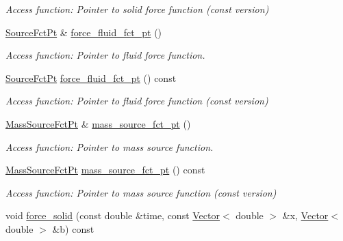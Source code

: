 \begin{DoxyCompactItemize}
\begin{DoxyCompactList}\small\item\em Access function\+: Pointer to solid force function (const version) \end{DoxyCompactList}\item 
\hyperlink{classoomph_1_1PoroelasticityEquations_a234bc29fbd4c3255ef903a3cb5f6361f}{Source\+Fct\+Pt} \& \hyperlink{classoomph_1_1PoroelasticityEquations_a0716cc72117daf3aced6cfd1d3763204}{force\+\_\+fluid\+\_\+fct\+\_\+pt} ()
\begin{DoxyCompactList}\small\item\em Access function\+: Pointer to fluid force function. \end{DoxyCompactList}\item 
\hyperlink{classoomph_1_1PoroelasticityEquations_a234bc29fbd4c3255ef903a3cb5f6361f}{Source\+Fct\+Pt} \hyperlink{classoomph_1_1PoroelasticityEquations_a2523a092b6190b733eb7c97a65587ecf}{force\+\_\+fluid\+\_\+fct\+\_\+pt} () const
\begin{DoxyCompactList}\small\item\em Access function\+: Pointer to fluid force function (const version) \end{DoxyCompactList}\item 
\hyperlink{classoomph_1_1PoroelasticityEquations_a8edb2644708db2f2ae03254ea3143262}{Mass\+Source\+Fct\+Pt} \& \hyperlink{classoomph_1_1PoroelasticityEquations_a043aed834e1643f94afdf078d722a141}{mass\+\_\+source\+\_\+fct\+\_\+pt} ()
\begin{DoxyCompactList}\small\item\em Access function\+: Pointer to mass source function. \end{DoxyCompactList}\item 
\hyperlink{classoomph_1_1PoroelasticityEquations_a8edb2644708db2f2ae03254ea3143262}{Mass\+Source\+Fct\+Pt} \hyperlink{classoomph_1_1PoroelasticityEquations_abdc8804cf42e7687e5ce9b10f2c1938e}{mass\+\_\+source\+\_\+fct\+\_\+pt} () const
\begin{DoxyCompactList}\small\item\em Access function\+: Pointer to mass source function (const version) \end{DoxyCompactList}\item 
void \hyperlink{classoomph_1_1PoroelasticityEquations_a2c770c55f51aa2c30febb44815a939cb}{force\+\_\+solid} (const double \&time, const \hyperlink{classoomph_1_1Vector}{Vector}$<$ double $>$ \&x, \hyperlink{classoomph_1_1Vector}{Vector}$<$ double $>$ \&b) const

\end{DoxyCompactItemize}
